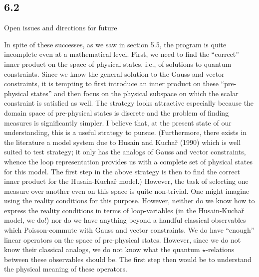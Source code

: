 \goodbreak
\subsection{6.2}{Open issues and directions for future}%

In spite of these successes, as we saw in section 5.5, the program is quite
incomplete even at a mathematical level. First, we need to
find the ``correct'' inner product on the space of physical states, i.e., of
solutions to quantum constraints. Since we know the general solution to the
Gauss and vector constraints, it is tempting to first introduce an inner
product on these ``pre-physical states'' and then focus on the physical
subspace on which the scalar constraint is satisfied as well. The strategy
looks attractive especially because the domain space of pre-physical states
is discrete and the problem of finding measures is significantly simpler. I
believe that, at the present state of our understanding, this is a useful
strategy to pursue. (Furthermore, there exists in the literature a model
system due to Husain and Kucha\v r (1990) which is well suited to test
strategy; it only has the analogs of Gauss and vector constraints,
whence the loop representation provides us with a complete set of physical
states for this model. The first step in the above strategy is then
to find the correct inner product for the Husain-Kucha\v r model.)
However, the task of selecting one measure over another even on this space is
quite non-trivial. One might imagine using the reality conditions for this
purpose. However, neither do we know how to express the reality conditions
in terms of loop-variables (in the Husain-Kucha\v r model, we do!) nor do
we have anything beyond a handful classical observables which Poisson-commute
with Gauss and vector constraints. We do have ``enough'' linear
operators on the space of pre-physical states. However, since we do not
know their classical analogs, we do not know what the quantum
$\star$-relations between these observables should be. The first step then
would be to understand the physical meaning of these operators.

